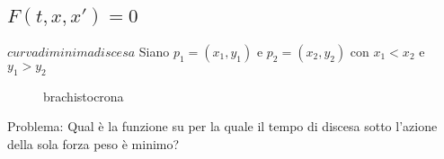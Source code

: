 \subsection{\(F{(t, x, x')} = 0\) }
\begin{example}[Brachistocrona]
    \(curva di minima discesa\) 
    Siano \(p_{1} = {(x_{1}, y_{1})}\) e \(p_{2} = {(x_{2}, y_{2})}\) con
    \(x_{1} < x_{2}\) e \(y_{1} > y_{2}\) 
\begin{figure}[ht]
    \centering
    \caption{brachistocrona}
    \label{fig:brachistocrona}
\end{figure}
    Problema: Qual è la funzione su per la quale il tempo di discesa sotto
    l'azione della sola forza peso è minimo?
\end{example}


